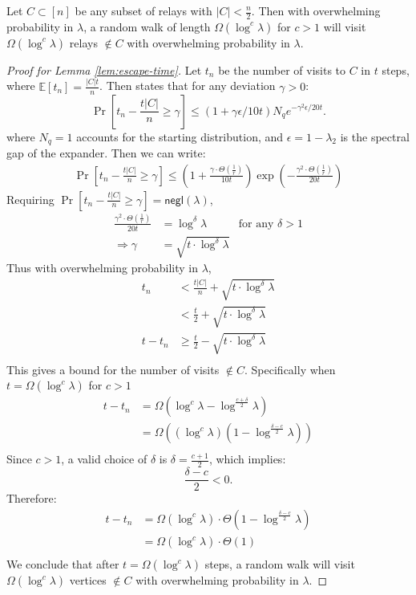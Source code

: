 \begin{lemma}\label{lem:escape-time}
Let $C \subset [n]$ be any subset of relays with $|C| < \frac{n}{2}$. Then with overwhelming probability in $\lambda$, a random walk of length $\Omega(\log^c \lambda)$ for $c > 1$ will visit $\Omega(\log^c \lambda)$ relays $\not\in C$ with overwhelming probability in $\lambda$.
\end{lemma}
\begin{proof}[Proof for Lemma \ref{lem:escape-time}]
Let $t_n$ be the number of visits to $C$ in $t$ steps, where $\mathbb{E}[t_n] = \frac{|C|t}{n}$. Then \cite[Theorem 2.1]{gillman1998chernoff} states that for any deviation $\gamma > 0$:
$$
\Pr[t_n - \frac{t|C|}{n} \geq \gamma] \leq (1 + \gamma \epsilon / 10t) N_q e^{-\gamma^2 \epsilon / 20t}.
$$
where $N_q = 1$ accounts for the starting distribution, and $\epsilon = 1 - \lambda_2$ is the spectral gap of the expander. Then we can write:
\begin{align*}
    \Pr[t_n - \frac{t|C|}{n} \geq \gamma] \leq (1 + \frac{\gamma \cdot \Theta\left(\frac{1}{r}\right)}{10t}) \exp(-\frac{\gamma^2 \cdot \Theta\left(\frac{1}{r}\right)}{20t})
\end{align*}
Requiring $\Pr[t_n - \frac{t|C|}{n} \geq \gamma] = \mathsf{negl}(\lambda)$,
\begin{align*}
    \frac{\gamma^2 \cdot \Theta\left(\frac{1}{r}\right)}{20t} &= \log^\delta \lambda &\text{for any $\delta > 1$}\\
    \Rightarrow \gamma &= \sqrt{t \cdot \log^\delta \lambda}
\end{align*}
Thus with overwhelming probability in $\lambda$, 
\begin{align*}
    t_n &< \frac{t|C|}{n} + \sqrt{t \cdot \log^\delta \lambda}\\
    &< \frac{t}{2} + \sqrt{t \cdot \log^\delta \lambda}\\
    t - t_n &\geq \frac{t}{2} - \sqrt{t \cdot \log^\delta \lambda}\\
\end{align*}
This gives a bound for the number of visits $\not\in C$. Specifically when $t = \Omega(\log^c \lambda)$ for $c > 1$
\begin{align*}
    t - t_n &= \Omega(\log^c \lambda - \log^{\frac{c + \delta}{2}}\lambda)\\
    &= \Omega((\log^c \lambda)(1 - \log^{\frac{\delta - c}{2}}\lambda))\\
\end{align*}
Since $c > 1$, a valid choice of $\delta$ is $\delta = \frac{c + 1}{2}$, which implies:
$$
\frac{\delta - c}{2} < 0.
$$
Therefore:
\begin{align*}
    t - t_n &= \Omega(\log^c \lambda) \cdot \Theta(1 - \log^{\frac{\delta - c}{2}}\lambda)\\
    &= \Omega(\log^c \lambda) \cdot \Theta(1)\\
\end{align*}
We conclude that after $t = \Omega(\log^c \lambda)$ steps, a random walk will visit $\Omega(\log^c \lambda)$ vertices $\not\in C$ with overwhelming probability in $\lambda$.
\end{proof}



